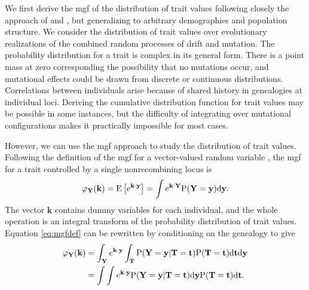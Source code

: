 We first derive the mgf of the distribution of trait values following closely
the approach of \citet{Schraiber2015} and \citet{Khaitovich2005}, but
generalizing to arbitrary demographies and population structure. We consider the
distribution of trait values over evolutionary realizations of the combined
random processes of drift and mutation. The probability distribution for a trait
is complex in its general form. There is a point mass at zero corresponding the
possibility that no mutations occur, and mutational effects could be drawn from
discrete or continuous distributions. Correlations between individuals arise
because of shared history in genealogies at individual loci. Deriving the
cumulative distribution function for trait values may be possible in some
instances, but the difficulty of integrating over mutational configurations
makes it practically impossible for most cases.

However, we can use the mgf approach to study the distribution of trait values.
Following the definition of the mgf for a vector-valued random
variable \citep{Ross}, the mgf for a trait controlled by a single nonrecombining
locus is
\begin{equation}
  \label{eq:mgfdef}
  \varphi_{\mathbf{Y}}(\mathbf{k}) = \mathrm{E}\left[ e^{\mathbf{k} \cdot \mathbf{y}} \right] =
  \int e^{\mathbf{k} \cdot \mathbf{Y}} \mathrm{P}(\mathbf{Y}=\mathbf{y}) \mbox{d}\mathbf{y}.
\end{equation}
The vector $\mathbf{k}$ contains dummy variables for each individual, and the
whole operation is an integral transform of the probability distribution of
trait values. Equation \eqref{eq:mgfdef} can be rewritten by conditioning on the
genealogy to give
\begin{align}
  \label{eq:cond}
  \varphi_{\mathbf{Y}}(\mathbf{k}) &= \int_{\mathbf{Y}} e^{\mathbf{k} \cdot \mathbf{y}}
  \int_{\mathbf{T}} \mathrm{P}(\mathbf{Y}=\mathbf{y} | \mathbf{T}=\mathbf{t}) \mathrm{P}(\mathbf{T}=\mathbf{t})
  \mbox{d}\mathbf{t} \mbox{d}\mathbf{y} \nonumber \\
  &= \int \int e^{\mathbf{k} \cdot \mathbf{y}} \mathrm{P}(\mathbf{Y}=\mathbf{y} | \mathbf{T}=\mathbf{t}) \mbox{d}\mathbf{y}
  \mathrm{P}(\mathbf{T}=\mathbf{t})
  \mbox{d}\mathbf{t}.
\end{align}

